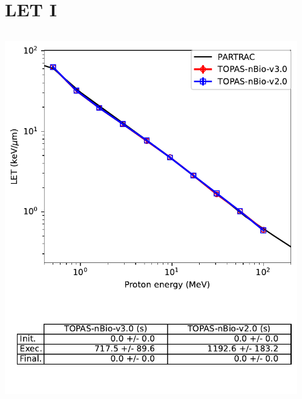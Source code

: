 \documentclass[aspectratio=1610]{beamer}
\begin{document}
\section{LET I}

\begin{frame}{\secname}
  \begin{columns}
    \begin{column}{0.4\linewidth}
     \includegraphics[width=\textwidth]{./LET/LET_TsEmDNAPhysics}
    \end{column}
    \begin{column}{0.4\linewidth} 

\end{column}
\end{columns}
\end{frame}
\end{document}
